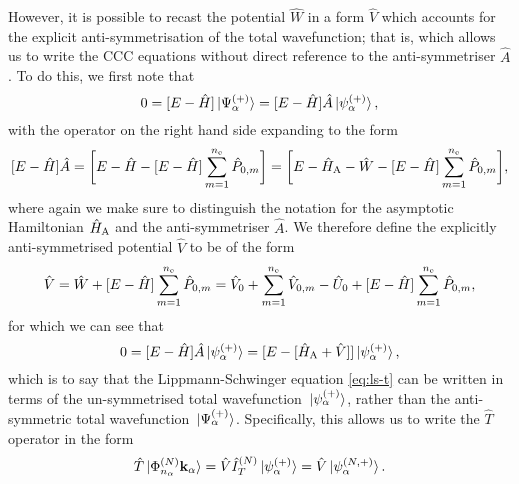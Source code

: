 \documentclass[draft]{article}
\begin{document}
However, it is possible to recast the potential $\hat{W}$ in a form $\hat{V}$
which accounts for the explicit anti-symmetrisation of the total wavefunction;
that is, which allows us to write the CCC equations without direct reference to
the anti-symmetriser $\hat{A}$.
To do this, we first note that
\begin{equation*}
  0
  =
  \lrsq
  {
    E
    -
    \hat{H}
  }
  \ket*{\Psi_{\alpha}^{\lr{+}}}
  =
  \lrsq
  {
    E
    -
    \hat{H}
  }
  \hat{A}
  \ket*{\psi_{\alpha}^{\lr{+}}}
  ,
\end{equation*}
with the operator on the right hand side expanding to the form
\begin{equation*}
  \lrsq
  {
    E
    -
    \hat{H}
  }
  \hat{A}
  =
  \lrsq[\bigg]
  {
    E
    -
    \hat{H}
    -
    \lrsq
    {
      E
      -
      \hat{H}
    }
    \sum_{m = 1}^{n_{\mathrm{e}}}
    \hat{P}_{0, m}
  }
  =
  \lrsq[\bigg]
  {
    E
    -
    \hat{H}_{\rm{A}}
    -
    \hat{W}
    -
    \lrsq
    {
      E
      -
      \hat{H}
    }
    \sum_{m = 1}^{n_{\mathrm{e}}}
    \hat{P}_{0, m}
  }
  ,
\end{equation*}
where again we make sure to distinguish the notation for the asymptotic
Hamiltonian $\hat{H}_{\rm{A}}$ and the anti-symmetriser $\hat{A}$.
We therefore define the explicitly anti-symmetrised potential $\hat{V}$ to be of
the form
\begin{equation}
  \label{eq:ccc-v}
  \hat{V}
  =
  \hat{W}
  +
  \lrsq
  {
    E
    -
    \hat{H}
  }
  \sum_{m = 1}^{n_{\mathrm{e}}}
  \hat{P}_{0, m}
  =
  \hat{V}_{0}
  +
  \sum_{m = 1}^{n_{\mathrm{e}}}
  \hat{V}_{0, m}
  -
  \hat{U}_{0}
  +
  \lrsq
  {
    E
    -
    \hat{H}
  }
  \sum_{m = 1}^{n_{\mathrm{e}}}
  \hat{P}_{0, m}
  ,
\end{equation}
for which we can see that
\begin{equation*}
  \label{eq:ccc-v-2}
  0
  =
  \lrsq
  {
    E
    -
    \hat{H}
  }
  \hat{A}
  \ket*{\psi_{\alpha}^{\lr{+}}}
  =
  \lrsq
  {
    E
    -
    \lrsq
    {
      \hat{H}_{\rm{A}}
      +
      \hat{V}
    }
  }
  \ket*{\psi_{\alpha}^{\lr{+}}}
  ,
\end{equation*}
which is to say that the Lippmann-Schwinger equation \autoref{eq:ls-t} can be
written in terms of the un-symmetrised total wavefunction
$\ket*{\psi_{\alpha}^{\lr{+}}}$, rather than the anti-symmetric total
wavefunction $\ket*{\Psi_{\alpha}^{\lr{+}}}$.
Specifically, this allows us to write the $\hat{T}$ operator in the form
\begin{equation}
  \label{eq:ccc-t-v}
  \hat{T}
  \ket*{\Phi_{n_{\alpha}}^{\lr{N}} \vb{k}_{\alpha}}
  =
  \hat{V}
  \hat{I}_{T}^{\lr{N}}
  \ket*{\psi_{\alpha}^{\lr{+}}}
  =
  \hat{V}
  \ket*{\psi_{\alpha}^{\lr{N, +}}}
  .
\end{equation}
\end{document}
